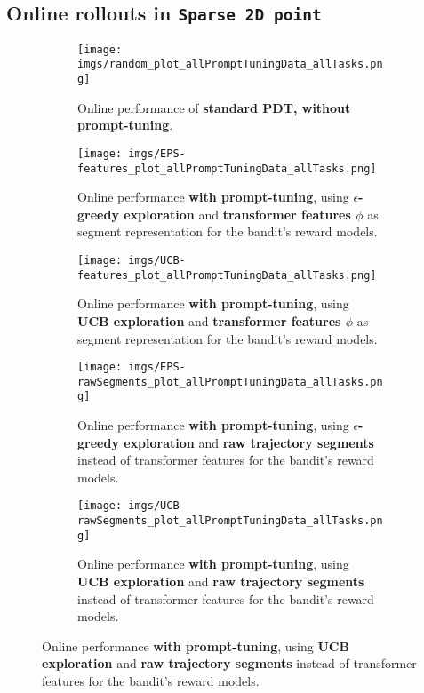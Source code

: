 \documentclass{article} %
\begin{document}
\subsection{Online rollouts in \texttt{Sparse 2D point}}\label{app:plots_2d_rollouts}
\begin{figure}[H]
    \centering
    \begin{subfigure}{\linewidth}
        \centering
        \texttt{[image: imgs/random\_plot\_allPromptTuningData\_allTasks.png]}
        \caption{Online performance of \textbf{standard PDT, without prompt-tuning}.}
        \label{fig:standardPDT_onlineRollouts_2d}
    \end{subfigure}
    \vspace{0.5em}
    \begin{subfigure}{\linewidth}
        \centering
        \texttt{[image: imgs/EPS-features\_plot\_allPromptTuningData\_allTasks.png]}
        \caption{Online performance \textbf{with prompt-tuning}, using \textbf{$\epsilon$-greedy exploration} and \textbf{transformer features $\phi$} as segment representation for the bandit's reward models.}
        \label{fig:epsgreedy_features_onlineRollouts_2d}
    \end{subfigure}
    \begin{subfigure}{\linewidth}
        \centering
        \texttt{[image: imgs/UCB-features\_plot\_allPromptTuningData\_allTasks.png]}
        \caption{Online performance \textbf{with prompt-tuning}, using \textbf{UCB exploration} and \textbf{transformer features $\phi$} as segment representation for the bandit's reward models.}
        \label{fig:ucb_features_onlineRollouts_2d}
    \end{subfigure}
    \begin{subfigure}{\linewidth}
        \centering
        \texttt{[image: imgs/EPS-rawSegments\_plot\_allPromptTuningData\_allTasks.png]}
        \caption{Online performance \textbf{with prompt-tuning}, using \textbf{$\epsilon$-greedy exploration} and \textbf{raw trajectory segments} instead of transformer features for the bandit's reward models.}
        \label{fig:epsgreedy_rawSegments_onlineRollouts_2d}
    \end{subfigure}
    \begin{subfigure}{\linewidth}
        \centering
        \texttt{[image: imgs/UCB-rawSegments\_plot\_allPromptTuningData\_allTasks.png]}
        \caption{Online performance \textbf{with prompt-tuning}, using \textbf{UCB exploration} and \textbf{raw trajectory segments} instead of transformer features for the bandit's reward models.}

\end{subfigure}
\end{figure}
\end{document}
